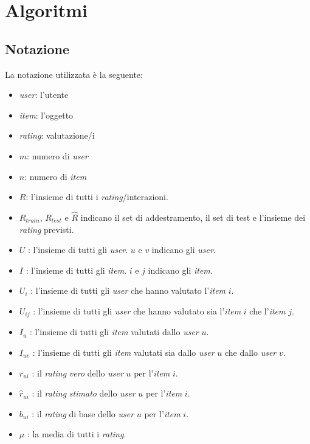 \chapter{Algoritmi}\label{algoritmi}

\section{Notazione}\label{notazione}

La notazione utilizzata è la seguente:

\begin{itemize}
    \item \textit{user}: l'utente
    \item \textit{item}: l'oggetto
    \item \textit{rating}: valutazione/i
    \item $m$: numero di \textit{user}
    \item $n$: numero di \textit{item}
    \item $R$: l'insieme di tutti i \textit{rating}/interazioni.
    \item $R_{train}$, $R_{test}$ e $\hat{R}$ indicano il set di addestramento, il set di test e l'insieme dei \textit{rating} previsti.
    \item $U$ : l'insieme di tutti gli \textit{user}. $u$ e $v$ indicano gli \textit{user}.
    \item $I$ : l'insieme di tutti gli \textit{item}. $i$ e $j$ indicano gli \textit{item}.
    \item $U_i$ : l'insieme di tutti gli \textit{user} che hanno valutato l'\textit{item} $i$.
    \item $U_{ij}$ : l'insieme di tutti gli \textit{user} che hanno valutato sia l'\textit{item} $i$ che l'\textit{item} $j$.
    \item $I_u$ : l'insieme di tutti gli \textit{item} valutati dallo \textit{user} $u$.
    \item $I_{uv}$ : l'insieme di tutti gli \textit{item} valutati sia dallo \textit{user} $u$ che dallo \textit{user} $v$.
    \item $r_{ui}$ : il \textit{rating} \textit{vero} dello \textit{user} $u$ per l'\textit{item} $i$.
    \item $\hat{r}_{ui}$ : il \textit{rating} \textit{stimato} dello \textit{user} $u$ per l'\textit{item} $i$.
    \item $b_{ui}$ : il \textit{rating} di base dello \textit{user} $u$ per l'\textit{item} $i$.
    \item $\mu$ : la media di tutti i \textit{rating}.

\end{itemize}
